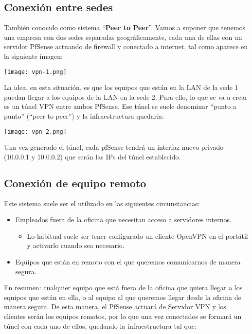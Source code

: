 \subsection{Conexión entre sedes}
También conocido como sistema “\textbf{Peer to Peer}”. Vamos a suponer que tenemos una empresa con dos sedes separadas geográficamente, cada una de ellas con un servidor PfSense actuando de firewall y conectado a internet, tal como aparece en la siguiente imagen:

\begin{center}
    \texttt{[image: vpn-1.png]}
\end{center}

La idea, en esta situación, es que los equipos que están en la LAN de la sede 1 puedan llegar a los equipos de la LAN en la sede 2. Para ello, lo que se va a crear es un túnel VPN entre ambos PfSense. Ese túnel se suele denominar “punto a punto” (“peer to peer”) y la infraestructura quedaría:

\begin{center}
    \texttt{[image: vpn-2.png]}
\end{center}

Una vez generado el túnel, cada pfSense tendrá un interfaz nuevo privado (10.0.0.1 y 10.0.0.2) que serán las IPs del túnel establecido.


\subsection{Conexión de equipo remoto}
Este sistema suele ser el utilizado en las siguientes circunstancias:

\begin{itemize}
    \item Empleados fuera de la oficina que necesitan acceso a servidores internos.
    \begin{itemize}
        \item Lo habitual suele ser tener configurado un cliente OpenVPN en el portátil y activarlo cuando sea necesario.
    \end{itemize}
    \item Equipos que están en remoto con el que queremos comunicarnos de manera segura.
\end{itemize}

En resumen: cualquier equipo que está fuera de la oficina que quiera llegar a los equipos que están en ella, o al equipo al que queremos llegar desde la oficina de manera segura. De esta manera, el PfSense actuará de Servidor VPN y los clientes serán los equipos remotos, por lo que una vez conectados se formará un túnel con cada uno de ellos, quedando la infraestructura tal que:

